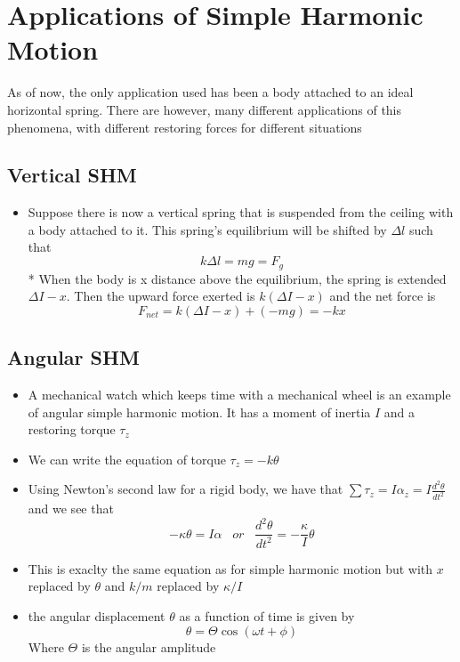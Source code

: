 \documentclass[11pt, a4paper]{article}
\begin{document}
\section{Applications of Simple Harmonic Motion}
As of now, the only application used has been a body attached to an ideal horizontal spring.
There are however, many different applications of this phenomena, with different restoring
forces for different situations

\subsection{Vertical SHM}
\begin{itemize}
    \item Suppose there is now a vertical spring that is suspended from the ceiling with a
        body attached to it. This spring's equilibrium will be shifted by $\Delta{}l$  such that
        \begin{equation}
            k\Delta{}l = mg = F_g
        \end{equation}
    * When the body is x distance above the equilibrium, the spring is extended
        $\Delta I - x$. Then the upward force exerted is $k(\Delta I - x)$ and the net force is
        \begin{equation}
            F_{net} = k(\Delta I - x) + (-mg) = -kx
        \end{equation}
\end{itemize}
\subsection{Angular SHM}
\begin{itemize}
    \item A mechanical watch which keeps time with a mechanical wheel is an example of angular
        simple harmonic motion. It has a moment of inertia $I$ and a restoring torque $\tau_{z}$
    \item We can write the equation of torque $\tau_{z} = -k\theta$
    \item Using Newton's second law for a rigid body, we have that $\sum\tau_{z} = I\alpha_z =
        I\frac{d^{2}\theta}{dt^{2}}$ and we see that
        \begin{equation}
            -\kappa\theta = I\alpha \; \; \; or \; \; \; \frac{d^{2}\theta}{dt^{2}} =
            -\frac{\kappa}{I}\theta
        \end{equation}
    \item This is exaclty the same equation as for simple harmonic motion but with $x$ replaced
        by $\theta$ and $k/m$ replaced by $\kappa/I$
    \item the angular displacement $\theta$ as a function of time is given by
        \begin{equation}
            \theta = \Theta\cos(\omega{}t + \phi)
        \end{equation}
        Where $\Theta$ is the angular amplitude
\end{itemize}
\end{document}
